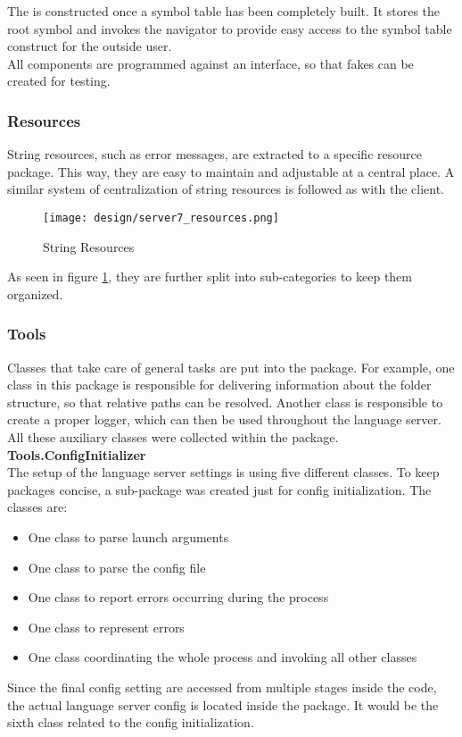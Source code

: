 The  is constructed once a symbol table has been completely built.
It stores the root symbol and invokes the navigator to provide easy access to the symbol table construct for the outside user.\\

All components are programmed against an interface, so that fakes can be created for testing.\\

\subsubsection{Resources}
String resources, such as error messages, are extracted to a specific resource package.
This way, they are easy to maintain and adjustable at a central place.
A similar system of centralization of string resources is followed as with the client.

\begin{figure}[H]
    \centering
    \texttt{[image: design/server7\_resources.png]}
    \caption{String Resources}
    \label{fig:server_resources}
\end{figure}

As seen in figure \ref{fig:server_resources}, they are further split into sub-categories to keep them organized.

\subsubsection{Tools}
Classes that take care of general tasks are put into the  package.
For example, one class in this package is responsible for delivering information about the folder structure, so that relative paths can be resolved.
Another class is responsible to create a proper logger, which can then be used throughout the language server.
All these auxiliary classes were collected within the  package.\\

\textbf{Tools.ConfigInitializer}\\
The setup of the language server settings is using five different classes.
To keep packages concise, a sub-package was created just for config initialization.
The classes are:
\begin{itemize}
    \item One class to parse launch arguments
    \item One class to parse the config file
    \item One class to report errors occurring during the process
    \item One class to represent errors
    \item One class coordinating the whole process and invoking all other classes
\end{itemize}
Since the final config setting are accessed from multiple stages inside the code, the actual language server config is located inside the  package.
It would be the sixth class related to the config initialization.

